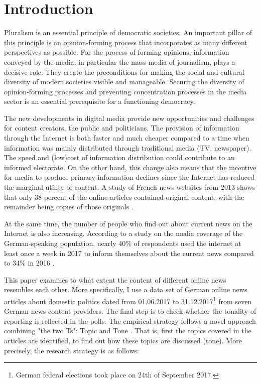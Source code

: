 \documentclass[12pt,a4paper,notitlepage]{article}
\begin{document}
\section{Introduction}

Pluralism is an essential principle of democratic societies. An important pillar of this principle is an opinion-forming process that incorporates as many different perspectives as possible. For the process of forming opinions, information conveyed by the media, in particular the mass media of journalism, plays a decisive role. They create the preconditions for making the social and cultural diversity of modern societies visible and manageable. Securing the diversity of opinion-forming processes and preventing concentration processes in the media sector is an essential prerequisite for a functioning democracy. 

The new developments in digital media provide new opportunities and challenges for content creators, the public and politicians. The provision of information through the Internet is both faster and much cheaper compared to a time when information was mainly distributed through traditional media (TV, newspaper). The speed and (low)cost of information distribution could contribute to an informed electorate. On the other hand, this change also means that the incentive for media to produce primary information declines since the Internet has reduced the marginal utility of content. A study of French news websites from 2013 shows that only 38 percent of the online articles contained original content, with the remainder being copies of those originals \citep{cage_information_2017}. 

At the same time, the number of people who find out about current news on the Internet is also increasing. According to a study on the media coverage of the German-speaking population, nearly 40\% of respondents used the internet at least once a week in 2017 to inform themselves about the current news compared to 34\% in 2016 \citep{vuma_arbeitsgemeinschaft_verbrauchs-_und_medienanalyse_verbrauchs-_2017}. 

This paper examines to what extent the content of different online news resembles each other. More specifically, I use a data set of German online news articles about domestic politics dated from 01.06.2017 to 31.12.2017\footnote{German federal elections took place on 24th of September 2017.} from seven German news content providers. The final step is to check whether the tonality of reporting is reflected in the polls. The empirical strategy follows a novel approach combining "the two Ts": Topic and Tone \citep{hansen_shocking_2016}. That is, first the topics covered in the articles are identified, to find out how these topics are discussed (tone). More precisely, the research strategy is as follows:
\end{document}
